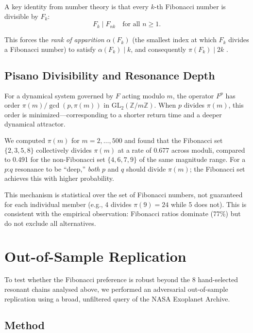 \documentclass[twocolumn,11pt]{article}
\begin{document}
A key identity from number theory is that every $k$-th Fibonacci
number is divisible by $F_k$:
\begin{equation}
F_k \mid F_{nk} \quad \text{for all } n \geq 1.
\label{eq:fibdiv}
\end{equation}

This forces the \emph{rank of apparition} $\alpha(F_k)$ (the smallest
index at which $F_k$ divides a Fibonacci number) to satisfy
$\alpha(F_k) \mid k$, and consequently $\pi(F_k) \mid 2k$
\citep{wall1960}.

\subsection{Pisano Divisibility and Resonance Depth}

For a dynamical system governed by $F$ acting modulo $m$, the operator
$F^p$ has order $\pi(m) / \gcd(p, \pi(m))$ in $\mathrm{GL}_2(\mathbb{Z}/m\mathbb{Z})$.  When $p$ divides $\pi(m)$, this order is
minimized---corresponding to a shorter return time and a deeper
dynamical attractor.

We computed $\pi(m)$ for $m = 2, \ldots, 500$ and found that the
Fibonacci set $\{2, 3, 5, 8\}$ collectively divides $\pi(m)$ at a
rate of 0.677 across moduli, compared to 0.491 for the non-Fibonacci
set $\{4, 6, 7, 9\}$ of the same magnitude range.  For a $p$:$q$
resonance to be ``deep,'' \emph{both} $p$ and $q$ should divide
$\pi(m)$; the Fibonacci set achieves this with higher probability.

This mechanism is statistical over the set of Fibonacci numbers, not
guaranteed for each individual member (e.g., 4 divides $\pi(9) = 24$
while 5 does not).  This is consistent with the empirical observation:
Fibonacci ratios dominate (77\%) but do not exclude all alternatives.

\section{Out-of-Sample Replication}
\label{sec:replication}

To test whether the Fibonacci preference is robust beyond the 8
hand-selected resonant chains analysed above, we performed an
adversarial out-of-sample replication using a broad, unfiltered query
of the NASA Exoplanet Archive.

\subsection{Method}
\end{document}
